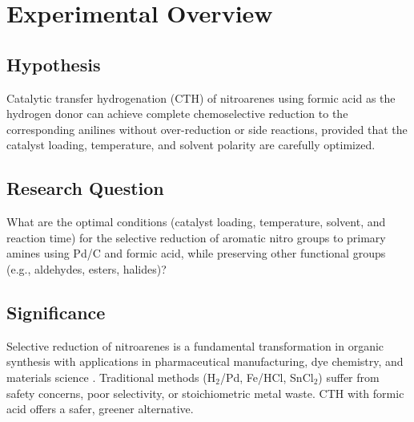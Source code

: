 \documentclass[
    language=english,
    doctype=experiment-log,
    institution=none,
]{../../omnilatex}
\begin{document}
\maketitle

\begin{abstract}
This experiment log documents a systematic investigation of catalytic transfer
hydrogenation of nitroarenes using formic acid as the hydrogen source and
palladium on carbon (Pd/C) as the catalyst. The study evaluates the effects
of catalyst loading, temperature, solvent system, and substrate scope on
reaction efficiency and selectivity. A total of 24 experiments were conducted
over a 6-week period, culminating in an optimized protocol that achieves
$>$95\% conversion for a broad range of substituted nitrobenzenes under mild
conditions.
\end{abstract}

\section{Experimental Overview}
\label{sec:overview}

\subsection{Hypothesis}

Catalytic transfer hydrogenation (CTH) of nitroarenes using formic acid as
the hydrogen donor can achieve complete chemoselective reduction to the
corresponding anilines without over-reduction or side reactions, provided
that the catalyst loading, temperature, and solvent polarity are carefully
optimized.

\subsection{Research Question}

What are the optimal conditions (catalyst loading, temperature, solvent,
and reaction time) for the selective reduction of aromatic nitro groups to
primary amines using Pd/C and formic acid, while preserving other functional
groups (e.g., aldehydes, esters, halides)?

\subsection{Significance}

Selective reduction of nitroarenes is a fundamental transformation in organic
synthesis with applications in pharmaceutical manufacturing, dye chemistry,
and materials science \cite{blaser2004catalytic}. Traditional methods (H$_2$/Pd,
Fe/HCl, SnCl$_2$) suffer from safety concerns, poor selectivity, or
stoichiometric metal waste. CTH with formic acid offers a safer, greener
alternative.
\end{document}
